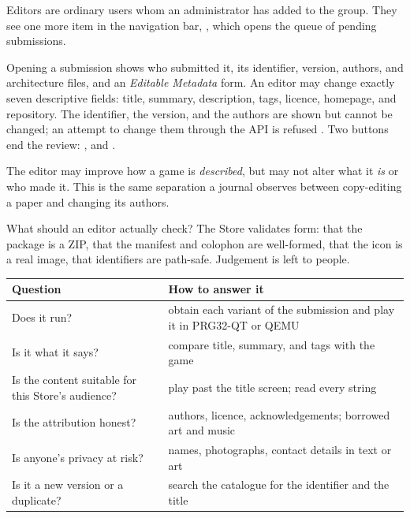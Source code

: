 Editors are ordinary users whom an administrator has added to the
 group. They see one more item in the navigation bar,
, which opens the queue of pending submissions.

Opening a submission shows who submitted it, its identifier, version, authors,
and architecture files, and an \emph{Editable Metadata} form. An editor may
change exactly seven descriptive fields: title, summary, description, tags,
licence, homepage, and repository. The identifier, the version, and the authors
are shown but cannot be changed; an attempt to change them through the API is
refused \citep{prg32storeapi}. Two buttons end the review: , and .



\begin{prgconcept}
The editor may improve how a game is \emph{described}, but may not alter what
it \emph{is} or who made it. This is the same separation a journal observes
between copy-editing a paper and changing its authors.
\end{prgconcept}

What should an editor actually check? The Store validates form: that the
package is a ZIP, that the manifest and colophon are well-formed, that the icon
is a real image, that identifiers are path-safe. Judgement is left to people.

\begin{center}
\begin{tabularx}{\linewidth}{@{}lX@{}}
\toprule
Question & How to answer it \\
\midrule
Does it run? & obtain each variant of the submission and play it in
  PRG32-QT or QEMU \\
Is it what it says? & compare title, summary, and tags with the game \\
Is the content suitable for this Store's audience? & play past the title
  screen; read every string \\
Is the attribution honest? & authors, licence, acknowledgements; borrowed art
  and music \\
Is anyone's privacy at risk? & names, photographs, contact details in text or
  art \\
Is it a new version or a duplicate? & search the catalogue for the identifier
  and the title \\
\bottomrule
\end{tabularx}
\end{center}

